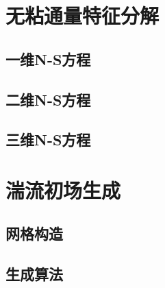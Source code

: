 ﻿\chapter{无粘通量特征分解}

\section{一维N-S方程}

\section{二维N-S方程}

\section{三维N-S方程}



\chapter{湍流初场生成}

\section{网格构造}

\section{生成算法}
